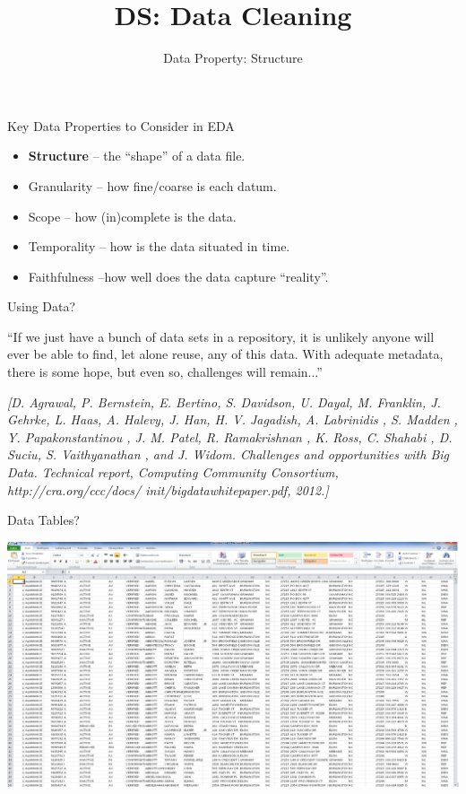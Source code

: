 \documentclass[aspectratio=169]{../latex_main/tntbeamer}  %
\title[Data Property: Structure]{DS: Data Cleaning}
\subtitle{Data Property: Structure}
\begin{document}
	
	\maketitle

\begin{frame}[c]{Key Data Properties to Consider in EDA}
    \begin{itemize}
        \item \textbf{Structure} -- the “shape” of a data file.
        \item {Granularity} -- how fine/coarse is each datum.
        \item {Scope} -- how (in)complete is the data.
        \item {Temporality} -- how is the data situated in time.
        \item {Faithfulness} --how well does the data capture “reality”.
    \end{itemize}
\end{frame}

\begin{frame}[c]{Using Data?}

``If we just have a bunch of data sets in a repository, it is unlikely anyone will ever be able to find, let alone reuse, any of this data. With adequate metadata, there is some
hope, but even so, challenges will remain...''

\bigskip

\textit{[D. Agrawal, P. Bernstein, E. Bertino, S. Davidson, U. Dayal, M. Franklin, J. Gehrke, L. Haas, A. Halevy, J. Han, H. V. Jagadish, A. Labrinidis , S. Madden , Y. Papakonstantinou , J. M. Patel, R. Ramakrishnan , K. Ross, C. Shahabi , D. Suciu, S. Vaithyanathan , and J. Widom. Challenges and opportunities with Big Data. Technical report, Computing Community Consortium,
http://cra.org/ccc/docs/ init/bigdatawhitepaper.pdf, 2012.]}

\end{frame}

\begin{frame}[c]{Data Tables?}

\includegraphics[width=1.0\textwidth]{bild6_excel}

\end{frame}
\end{document}
